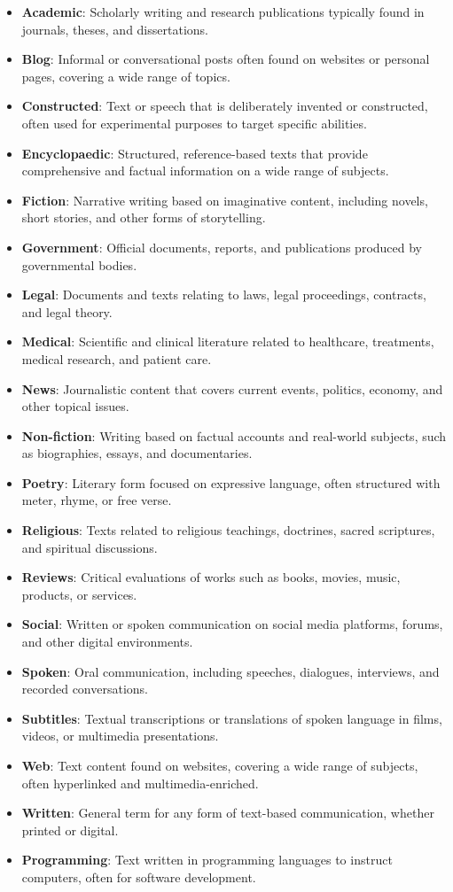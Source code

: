 \begin{itemize}
    \item \textbf{Academic}: Scholarly writing and research publications typically found in journals, theses, and dissertations.
    \item \textbf{Blog}: Informal or conversational posts often found on websites or personal pages, covering a wide range of topics.
    \item \textbf{Constructed}: Text or speech that is deliberately invented or constructed, often used for experimental purposes to target specific abilities.
    \item \textbf{Encyclopaedic}: Structured, reference-based texts that provide comprehensive and factual information on a wide range of subjects.
    \item \textbf{Fiction}: Narrative writing based on imaginative content, including novels, short stories, and other forms of storytelling.
    \item \textbf{Government}: Official documents, reports, and publications produced by governmental bodies.
    \item \textbf{Legal}: Documents and texts relating to laws, legal proceedings, contracts, and legal theory.
    \item \textbf{Medical}: Scientific and clinical literature related to healthcare, treatments, medical research, and patient care.
    \item \textbf{News}: Journalistic content that covers current events, politics, economy, and other topical issues.
    \item \textbf{Non-fiction}: Writing based on factual accounts and real-world subjects, such as biographies, essays, and documentaries.
    \item \textbf{Poetry}: Literary form focused on expressive language, often structured with meter, rhyme, or free verse.
    \item \textbf{Religious}: Texts related to religious teachings, doctrines, sacred scriptures, and spiritual discussions.
    \item \textbf{Reviews}: Critical evaluations of works such as books, movies, music, products, or services.
    \item \textbf{Social}: Written or spoken communication on social media platforms, forums, and other digital environments.
    \item \textbf{Spoken}: Oral communication, including speeches, dialogues, interviews, and recorded conversations.
    \item \textbf{Subtitles}: Textual transcriptions or translations of spoken language in films, videos, or multimedia presentations.
    \item \textbf{Web}: Text content found on websites, covering a wide range of subjects, often hyperlinked and multimedia-enriched.
    \item \textbf{Written}: General term for any form of text-based communication, whether printed or digital.
    \item \textbf{Programming}: Text written in programming languages to instruct computers, often for software development.
\end{itemize}

